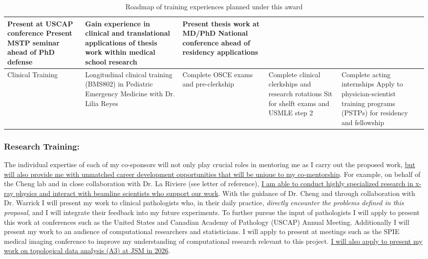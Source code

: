 \documentclass{NIHGrant}
\begin{document}
\begin{table}[h]
\begin{tabularx}{\textwidth}{|l|>{\centering\arraybackslash}X|>{\centering\arraybackslash}X|>{\centering\arraybackslash}X|>{\centering\arraybackslash}X|}
    Present at USCAP conference \newline
    Present MSTP seminar ahead of PhD defense&
    Gain experience in clinical and translational applications of thesis work within medical school research &
    Present thesis work at MD/PhD National conference ahead of residency applications \\
    \hline
    Clinical Training &
    Longitudinal clinical training (BMS802) in Pediatric Emergency Medicine with Dr. Lilia Reyes &
    Complete OSCE exams and pre-clerkship &
    Complete clinical clerkships and research rotations \newline
    Sit for shelft exams and USMLE step 2 &
    Complete acting internships \newline Apply to physician-scientist training programs (PSTPs) for residency and fellowship\\
  \hline
\end{tabularx}
\caption{Roadmap of training experiences planned under this award}
\label{tab:goals}
\end{table}

\subsubsection{Research Training: }
The individual expertise of each of my co-sponsors will not only play crucial roles in mentoring me as I carry out the proposed work, \uline{but will also provide me with unmatched career development opportunities that will be unique to my co-mentorship}. For example, on behalf of the Cheng lab and in close collaboration with Dr. La Riviere (see letter of reference), \uline{I am able to conduct highly specialized research in x-ray physics and interact with beamline scientists who support our work}. With the guidance of Dr. Cheng and through collaboration with Dr. Warrick I will present my work to clinical pathologists who, in their daily practice, \emph{directly encounter the problems defined in this proposal}, and I will integrate their feedback into my future experiments. To further pursue the input of pathologists I will apply to present this work at conferences such as the United States and Canadian Academy of Pathology (USCAP) Annual Meeting. Additionally I will present my work to an audience of computational researchers and statisticians. I will apply to present at meetings such as the SPIE medical imaging conference to improve my understanding of computational research relevant to this project. \uline{I will also apply to present my work on topological data analysis (A3) at JSM in 2026}.
\end{document}

